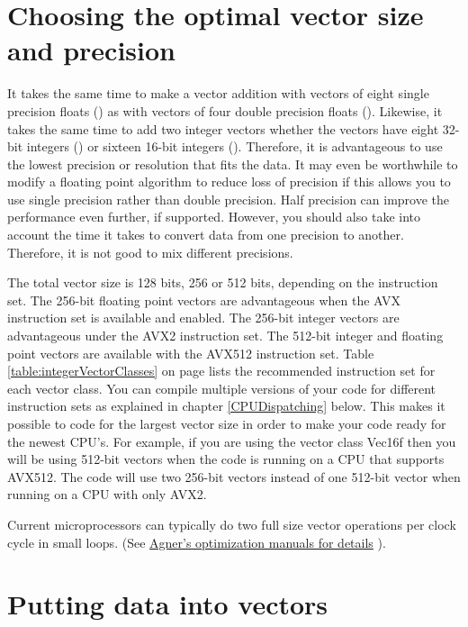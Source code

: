 \documentclass[vcl_manual.tex]{subfiles}
\begin{document}
\section{Choosing the optimal vector size and precision} \label{ChoosingOptimalVectorSize}

It takes the same time to make a vector addition with vectors of eight single precision floats () as with vectors of four double precision floats (). Likewise, it takes the same time to add two integer vectors whether the vectors have eight 32-bit integers () or sixteen 16-bit integers (). Therefore, it is advantageous to use the lowest precision or resolution that fits the data. It may even be worthwhile to modify a floating point algorithm to reduce loss of precision if this allows you to use single precision rather than double precision. Half precision can improve the performance even further, if supported. 
However, you should also take into account the time it takes to convert data from one precision to another. Therefore, it is not good to mix different precisions.

The total vector size is 128 bits, 256 or 512 bits, depending on the instruction set. 
The 256-bit floating point vectors are advantageous when the AVX instruction set is available and enabled. The 256-bit integer vectors are advantageous under the AVX2 instruction set. 
The 512-bit integer and floating point vectors are available with the AVX512 instruction set.
Table \ref{table:integerVectorClasses} on page \pageref{table:integerVectorClasses} lists the recommended instruction set for each vector class. 
You can compile multiple versions of your code for different instruction sets as explained in chapter \ref{CPUDispatching} below. This makes it possible to code for the largest vector size in order to make your code ready for the newest CPU's. 
For example, if you are using the vector class Vec16f then you will be using 512-bit vectors when the code is running on a CPU that supports AVX512. The code will use two 256-bit vectors instead of one 512-bit vector when running on a CPU with only AVX2.

Current microprocessors can typically do two full size vector operations per clock cycle in small loops. (See \href{https://www.agner.org/optimize/#manuals}{Agner's optimization manuals for details} ).


\section{Putting data into vectors}\label{PuttingDataIntoVectors}
\end{document}
